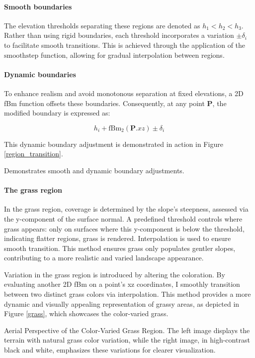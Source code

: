 \paragraph{Smooth boundaries}
The elevation thresholds separating these regions are denoted as $h_{1} < h_{2} < h_{3}$. Rather than using rigid boundaries, each threshold incorporates a variation $\pm \delta_i$ to facilitate smooth transitions. This is achieved through the application of the $\text{smoothstep}$ function, allowing for gradual interpolation between regions.

\paragraph{Dynamic boundaries}
To enhance realism and avoid monotonous separation at fixed elevations, a 2D fBm function offsets these boundaries. Consequently, at any point $\mathbf{P}$, the modified boundary is expressed as:

\begin{equation}
    h_{i} + \text{fBm}_{2}(\mathbf{P}.xz) \pm \delta_i
\end{equation}

This dynamic boundary adjustment is demonstrated in action in Figure \ref{region_transition}.

{Demonstrates smooth and dynamic boundary adjustments.}

\paragraph{The grass region}
In the grass region, coverage is determined by the slope's steepness, assessed via the y-component of the surface normal. A predefined threshold controls where grass appears: only on surfaces where this y-component is below the threshold, indicating flatter regions, grass is rendered. Interpolation is used to ensure smooth transition. This method ensures grass only populates gentler slopes, contributing to a more realistic and varied landscape appearance.

Variation in the grass region is introduced by altering the coloration. By evaluating another 2D fBm on a point's xz coordinates, I smoothly transition between two distinct grass colors via interpolation. This method provides a more dynamic and visually appealing representation of grassy areas, as depicted in Figure \ref{grass}, which showcases the color-varied grass.

{Aerial Perspective of the Color-Varied Grass Region. The left image displays the terrain with natural grass color variation, while the right image, in high-contrast black and white, emphasizes these variations for clearer visualization.}

